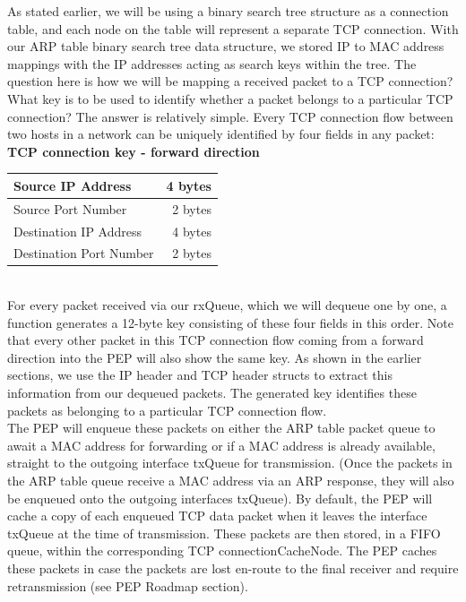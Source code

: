 \documentclass{uathesis}
\begin{document}
As stated earlier, we will be using a binary search tree structure as a connection table, and each node on the table will represent a separate TCP connection. With our ARP table binary search tree data structure, we stored IP to MAC address mappings with the IP addresses acting as search keys within the tree. The question here is how we will be mapping a received packet to a TCP connection? What key is to be used to identify whether a packet belongs to a particular TCP connection? The answer is relatively simple. Every TCP connection flow between two hosts in a network can be uniquely identified by four fields in any packet:\\

\textbf{TCP connection key - forward direction} \\

\begin{tabular}{|l|r|}
	\hline
	Source IP Address & 4 bytes\\
	\hline
    Source Port Number & 2 bytes\\
	\hline
    Destination IP Address & 4 bytes\\
	\hline
    Destination Port Number & 2 bytes\\
    \hline 
\end{tabular} \\

For every packet received via our rxQueue, which we will dequeue one by one, a function generates a 12-byte key consisting of these four fields in this order. Note that every other packet in this TCP connection flow coming from a forward direction into the PEP will also show the same key. As shown in the earlier sections, we use the IP header and TCP header structs to extract this information from our dequeued packets. The generated key identifies these packets as belonging to a particular TCP connection flow.
\\

The PEP will enqueue these packets on either the ARP table packet queue to await a MAC address for forwarding or if a MAC address is already available, straight to the outgoing interface txQueue for transmission. (Once the packets in the ARP table queue receive a MAC address via an ARP response, they will also be enqueued onto the outgoing interfaces txQueue). By default, the PEP will cache a copy of each enqueued TCP data packet when it leaves the interface txQueue at the time of transmission. These packets are then stored, in a FIFO queue, within the corresponding TCP connectionCacheNode. The PEP  caches these packets in case the packets are lost en-route to the final receiver and require retransmission (see PEP Roadmap section).\\
\end{document}
